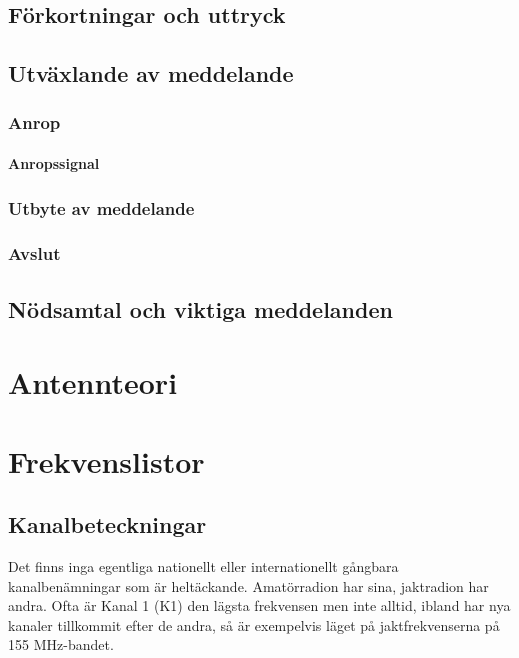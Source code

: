 \documentclass[12ypt,swedish,a4paper]{report}
\begin{document}


\section{Förkortningar och uttryck}

\section{Utväxlande av meddelande}

\subsection{Anrop}

\subsubsection{Anropssignal}

\subsection{Utbyte av meddelande}

\subsection{Avslut}

\section{Nödsamtal och viktiga meddelanden}

\chapter{Antennteori}

\chapter{Frekvenslistor}
\label{kap:frekvenslistor}

\section{Kanalbeteckningar}

Det finns inga egentliga nationellt eller internationellt gångbara kanalbenämningar som är heltäckande. Amatörradion har sina, jaktradion har andra. Ofta är Kanal 1 (K1) den lägsta frekvensen men inte alltid, ibland har nya kanaler tillkommit efter de andra, så är exempelvis läget på jaktfrekvenserna på 155 MHz-bandet.
\end{document}
